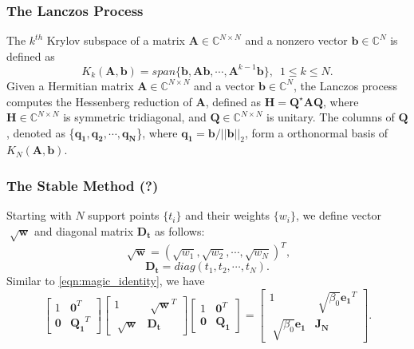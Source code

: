\documentclass[11pt,letter]{article}
\begin{document}
\subsubsection{The Lanczos Process}
The $k^{th}$ Krylov subspace of a matrix $\mathbf{A}\in\mathbb{C}^{N\times N}$ and a nonzero vector $\mathbf{b}\in\mathbb{C}^N$ is defined as $$K_k(\mathbf{A},\mathbf{b})=span\{\mathbf{b},\mathbf{A}\mathbf{b},\cdots,\mathbf{A}^{k-1}\mathbf{b}\},\,\,\, 1\leq k\leq N.$$
Given a Hermitian matrix $\mathbf{A}\in\mathbb{C}^{N\times N}$ and a vector $\mathbf{b}\in\mathbb{C}^N$, the Lanczos process computes the Hessenberg reduction of $\mathbf{A}$, defined as $\mathbf{H}=\mathbf{Q}^{\star}\mathbf{A}\mathbf{Q}$, where $\mathbf{H}\in\mathbb{C}^{N\times N}$ is symmetric tridiagonal, and $\mathbf{Q}\in\mathbb{C}^{N\times N}$ is unitary. The columns of $\mathbf{Q}$, denoted as \{$\mathbf{q_1},\mathbf{q_2},\cdots,\mathbf{q_N}$\}, where $\mathbf{q_1}=\mathbf{b}/||\mathbf{b}||_2$, form a orthonormal basis of $K_N(\mathbf{A},\mathbf{b})$.\\



\subsubsection{The Stable Method (?)}
Starting with $N$ support points $\{t_i\}$ and their weights $\{w_i\}$, we define vector $\sqrt[]{\mathbf{w}}$ and diagonal matrix $\mathbf{D_t}$ as follows: $$\sqrt[]{\mathbf{w}}=(\sqrt{w_1},\sqrt{w_2},\cdots,\sqrt{w_N})^T,$$ $$\mathbf{D_t}=diag(t_1,t_2,\cdots,t_N).$$
Similar to \eqref{eqn:magic_identity}, we have
\begin{equation}
\label{eqn:magic_identity_original}
\begin{bmatrix}1 &\mathbf{0}^T\\ \mathbf{0} & \mathbf{Q_1}^T\end{bmatrix} \begin{bmatrix}1 &\sqrt[]{\mathbf{w}}^T\\\sqrt[]{\mathbf{w}} &\mathbf{D_t} \end{bmatrix} 
\begin{bmatrix}1 &\mathbf{0}^T\\ \mathbf{0} & \mathbf{Q_1}\end{bmatrix} = \begin{bmatrix}1 & \sqrt[]{\beta_{0}}\mathbf{e_1}^T\\ \sqrt[]{\beta_{0}}\mathbf{e_1} &\mathbf{J_N} \end{bmatrix}.
\end{equation}
\end{document}
